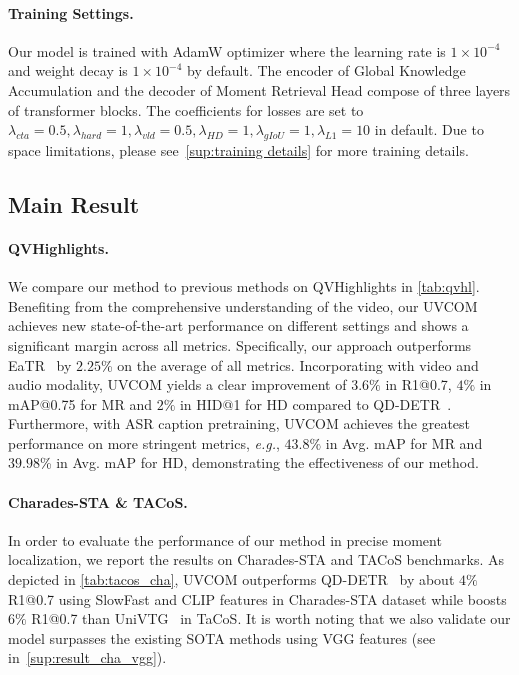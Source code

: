 \paragraph{Training Settings.} Our model is trained with AdamW optimizer where the learning rate is $1 \times 10^{-4}$ and weight decay is $1 \times 10^{-4}$ by default. The encoder of Global Knowledge Accumulation and the decoder of Moment Retrieval Head compose of three layers of transformer blocks.
The coefficients for losses are set to 
$\lambda_{cta}=0.5,\lambda_{hard}=1,\lambda_{vld}=0.5,\lambda_{HD}=1,\lambda_{gIoU}=1,\lambda_{L1}=10$ in default. 
Due to space limitations, please see~\cref{sup:training details} for more training details.

\subsection{Main Result}
\paragraph{QVHighlights.} We compare our method to previous methods on QVHighlights in \cref{tab:qvhl}.
Benefiting from the comprehensive understanding of the video, our UVCOM achieves new state-of-the-art performance on different settings and shows a significant margin across all metrics.
Specifically, our approach outperforms EaTR~\cite{eatr} by $2.25$\% on the average of all metrics.
Incorporating with video and audio modality, UVCOM yields a clear improvement of $3.6\%$ in R1@0.7, $4\%$ in mAP@0.75 for MR and $2\%$ in HID@1 for HD compared to QD-DETR~\cite{qddetr}.
Furthermore, with ASR caption pretraining, UVCOM achieves the greatest performance on more stringent metrics, \textit{e.g.}, $43.8\%$ in Avg. mAP for MR and $39.98$\% in Avg. mAP for HD, demonstrating the effectiveness of our method. 

\vspace{-10pt}
\paragraph{Charades-STA \& TACoS.}
In order to evaluate the performance of our method in precise moment localization, we report the results on Charades-STA and TACoS benchmarks.
As depicted in \cref{tab:tacos_cha}, UVCOM outperforms QD-DETR~\cite{qddetr} by about $4\%$ R1@0.7 using SlowFast and CLIP features in Charades-STA dataset while boosts $6\%$ R1@0.7 than UniVTG~\cite{univtg} in TaCoS. It is worth noting that we also validate our model surpasses the existing SOTA methods using VGG features (see in~\cref{sup:result_cha_vgg}).

